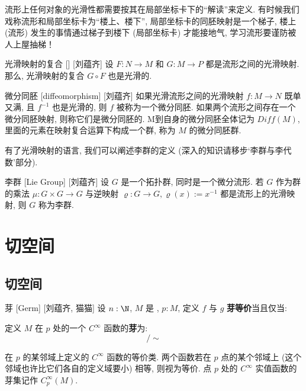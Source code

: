 \documentclass[UTF8]{ctexart}
\begin{document}
        \begin{rmk}
            []
            流形上任何对象的光滑性都需要按其在局部坐标卡下的“解读”来定义. 
            有时候我们戏称流形和局部坐标卡为“楼上、楼下”, 局部坐标卡的同胚映射是一个梯子, 楼上 (流形) 发生的事情通过梯子到楼下 (局部坐标卡) 才能接地气, 
            学习流形要谨防被人上屋抽梯！
        \end{rmk}

        \begin{ppt}
            []
            {光滑映射的复合}
            []
            [刘蕴齐]
            设 \(F: N \to M\)  和  \(G: M \to P\) 都是流形之间的光滑映射. 那么, 光滑映射的复合 \(G \circ F\) 也是光滑的. 
        \end{ppt}
        
        \vspace{10pt}
        
        \begin{dfn}
            []
            {微分同胚}
            [diffeomorphism]
            [刘蕴齐]
            如果光滑流形之间的光滑映射 \( f:M \to N\) 既单又满, 且 \(f^{-1}\) 也是光滑的, 
            则 \(f\) 被称为一个微分同胚. 
            如果两个流形之间存在一个微分同胚映射, 则称它们是微分同胚的. 
            M到自身的微分同胚全体记为 \(Diff(M)\),
            里面的元素在映射复合运算下构成一个群, 称为 \(M\) 的微分同胚群. 
        \end{dfn}

        有了光滑映射的语言, 我们可以阐述李群的定义 (深入的知识请移步‘李群与李代数’部分). 

        \begin{dfn}
            []
            {李群}
            [Lie Group]
            [刘蕴齐]
            设 \(G\) 是一个拓扑群, 同时是一个微分流形. 若 \(G\) 作为群的乘法 \(\mu: G \times G \to G\) 与逆映射
             \(\varrho: G \to G, \varrho(x):= x^{-1}\) 
            都是流形上的光滑映射, 则 \(G\) 称为李群. 
        \end{dfn}

    
\section{切空间}

    \subsection{切空间}

        \begin{dfn}
            [Germ]
            {芽}
            [Germ]
            [刘蕴齐, 猫猫]
            设 \(n:\N\), \(M\) 是 , \(p:M\), 定义 \(f\) 与 \(g\) \textbf{芽等价}当且仅当: 
            
            定义 \(M\) 在 \(p\) 处的一个 \(C^{\infty}\) 函数的\textbf{芽}为: 
            \[/\sim\]

            在 \(p\) 的某邻域上定义的 \(C^{\infty}\) 函数的等价类. 两个函数若在 \(p\) 点的某个邻域上 (这个邻域也许比它们各自的定义域要小) 相等, 则视为等价. 点 \(p\) 处的 \(C^{\infty}\) 实值函数的芽集记作 \(C^{\infty}_p(M)\). 
        \end{dfn}
\end{document}
